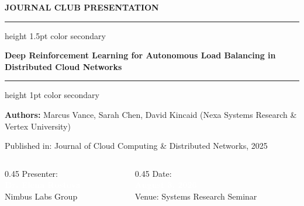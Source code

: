 {%
\begin{frame}[plain]
  \vspace{0.8cm}
  \begin{center}
    \textcolor{secondary}{\large\textbf{\faBook{} JOURNAL CLUB PRESENTATION}}
    \vspace{0.3cm}
    
    \hrule height 1.5pt color secondary
    \vspace{0.5cm}
    
    {\Large\textbf{Deep Reinforcement Learning for Autonomous Load Balancing in Distributed Cloud Networks}\par}
    
    \vspace{0.4cm}
    \hrule height 1pt color secondary
    \vspace{0.5cm}
    
    {\small\textbf{Authors:} Marcus Vance, Sarah Chen, David Kincaid (Nexa Systems Research \& Vertex University)}
    
    \vspace{0.1cm}
    \textcolor{textmuted}{\footnotesize Published in: Journal of Cloud Computing \& Distributed Networks, 2025}
    
    \vspace{0.8cm}
    \begin{columns}[c]
      \begin{column}{0.45\textwidth}
        \flushleft
        \footnotesize
        \textcolor{textmuted}{Presenter:}\\
        \textbf{\textcolor{white}{Dr. Elena Rostova}}\\
        \textcolor{textmuted}{Nimbus Labs Group}
      \end{column}
      \begin{column}{0.45\textwidth}
        \flushright
        \footnotesize
        \textcolor{textmuted}{Date:}\\
        \textbf{\textcolor{white}{August 3, 2026}}\\
        \textcolor{textmuted}{Venue: Systems Research Seminar}
      \end{column}
    \end{columns}
  \end{center}
\end{frame}
}
